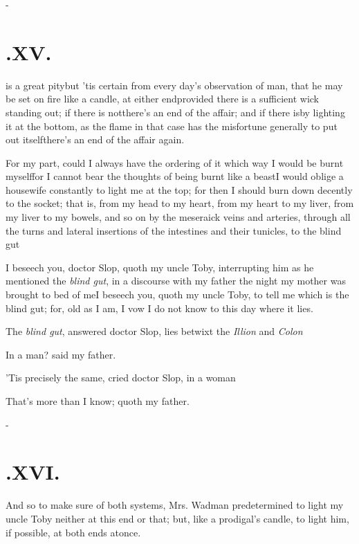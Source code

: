 \documentclass{article}
\begin{document}
\vfill{}\eject
\null\kern-\baselineskip
\section{.\enspace XV.}

 is a great pity\tsh but
’tis certain from every day’s observation of man, that
he may be set on fire like a candle, at either end\tsk provided
there is a sufficient wick standing out; if there is
not\break\tsk there’s an end of the affair; and if there
is\tsk by lighting it at the bottom, as the flame in that case
has the misfortune generally to put out itself\tsk there’s
an end of the affair again.

For my part, could I always have the ordering of it which way I
would be burnt myself\tsk for I cannot bear the thoughts of being
burnt like a beast\tsk\break I would oblige a housewife constantly to
light me at the top; for then I should burn down decently to the
socket; that is, from my head to my heart, from my heart to my
liver, from my liver to my bowels, and so on by the meseraick veins
and arteries, through all the turns and lateral insertions of the
intestines and\break
their tunicles, to the blind gut\tsh

\noindent
\tsh I beseech you, doctor Slop, quoth my uncle
Toby, interrupting him as he mentioned the \textit{blind gut},
in a discourse with my father the night my mother was brought to
bed of me\tsh I beseech you, quoth my uncle Toby,
to tell me which is the blind gut; for, old as I am, I vow I do not
know to this day where it lies.

The \textit{blind gut}, answered doctor Slop, lies betwixt the
\textit{Illion} and \textit{Colon}\tsh

\tsh In a man? said my father.

\tsh ’Tis precisely the same, cried
doctor Slop, in a woman\tsh

That’s more than I know; quoth my father.

\vfill{}\eject
\null\kern-\baselineskip
\section{.\enspace XVI.}

\quad
\tsh And so to make sure of both systems, Mrs.
Wadman predetermined to light my uncle Toby neither
at this end or that; but, like a prodigal’s candle, to light
him, if possible, at both ends at\break once.
\end{document}
